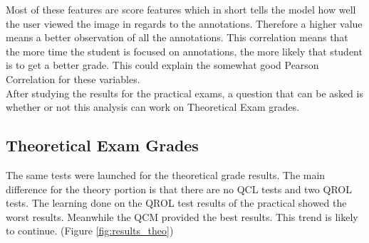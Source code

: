 \documentclass[a4paper,11pt]{report}
\numberwithin{figure}{section} %
\begin{document}
   Most of these features are score features which in short tells the model how well the user viewed the image in regards to the annotations.
   Therefore a higher value means a better observation of all the annotations.
   This correlation means that the more time the student is focused on annotations, the more likely that student is to get a better grade.
   This could explain the somewhat good Pearson Correlation for these variables.\\

   After studying the results for the practical exams, a question that can be asked is whether or not this analysis can work on Theoretical Exam grades.

    \subsection{Theoretical Exam Grades}

        The same tests were launched for the theoretical grade results.
        The main difference for the theory portion is that there are no QCL tests and two QROL tests.
        The learning done on the QROL test results of the practical showed the worst results.
        Meanwhile the QCM provided the best results.
        This trend is likely to continue. (Figure \ref{fig:results_theo})
\end{document}

